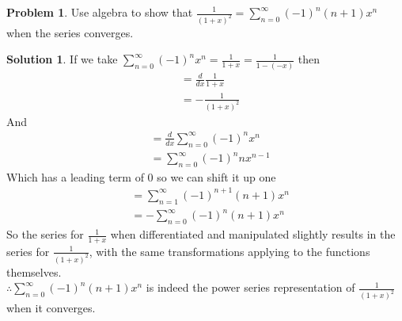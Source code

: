 \documentclass[10pt]{article}
\theoremstyle{definition}
\newtheorem{problem}{Problem}
\newtheorem{soln}{Solution}
\begin{document}
\begin{problem}
Use algebra to show that $\displaystyle \frac{1}{(1+x)^2}=\sum_{n = 0}^{\infty} (-1)^n(n+1)x^n$ when the series converges.
\end{problem}
\begin{soln} If we take $\displaystyle \sum_{n=0}^{\infty}(-1)^nx^n=\frac{1}{1+x}=\frac{1}{1-(-x)}$ then
      \begin{align*}
             & = \frac{d}{dx}\frac{1}{1+x} \\
             & = -\frac{1}{(1+x)^2}
      \end{align*}
      And
      \begin{align*}
             & = \frac{d}{dx}\sum_{n=0}^{\infty}(-1)^nx^n \\
             & = \sum_{n=0}^{\infty}(-1)^nnx^{n-1}
      \end{align*}
      Which has a leading term of 0 so we can shift it up one
      \begin{align*}
             & = \sum_{n=1}^{\infty}(-1)^{n+1} (n+1) x^{n} \\
             & = -\sum_{n=0}^{\infty}(-1)^n(n+1)x^n
      \end{align*}
      So the series for $\displaystyle \frac{1}{1+x}$ when differentiated and manipulated slightly results in the series for $\displaystyle \frac{1}{(1+x)^2}$, with the same transformations applying to
      the functions themselves. \\

      \noindent $\displaystyle \therefore \sum_{n=0}^{\infty}(-1)^n(n+1)x^n$ is indeed the power series representation of $\displaystyle \frac{1}{(1+x)^2}$ when it converges.

\end{soln}
\end{document}
